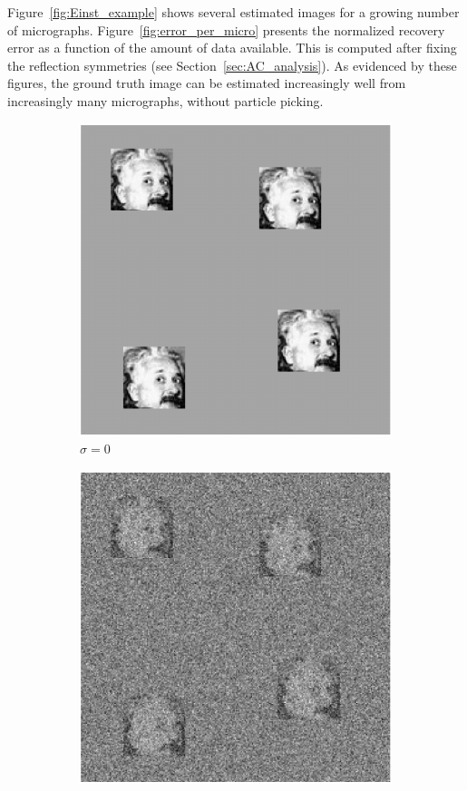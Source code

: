 \documentclass[12pt]{article}
\newcommand{\1}{\mathbf{1}}
\theoremstyle{plain}
\theoremstyle{definition}
\theoremstyle{remark}
\theoremstyle{plain}
\theoremstyle{remark}
\theoremstyle{plain}
\theoremstyle{plain}
\theoremstyle{plain}
\numberwithin{equation}{section}
\begin{document}
Figure~\ref{fig:Einst_example} shows several estimated images for a growing number of micrographs. 
Figure~\ref{fig:error_per_micro} %
presents the normalized recovery error as a function of the amount of data available.  This is computed after fixing the reflection symmetries (see Section~\ref{sec:AC_analysis}). As evidenced by these figures, the ground truth image can be estimated increasingly well from increasingly many micrographs, without particle picking.

\begin{figure}[t]
	\centering
	\begin{subfigure}[h]{0.33\linewidth}
		\centering
		\includegraphics[width=.8\linewidth]{micrograph_Einstein_example_clean}
		\caption{$\sigma = 0$}
	\end{subfigure}%
	\begin{subfigure}[h]{0.33\linewidth}
		\centering
		\includegraphics[width=.8\linewidth]{micrograph_Einstein_example_s05}

\end{subfigure}
\end{figure}
\end{document}
